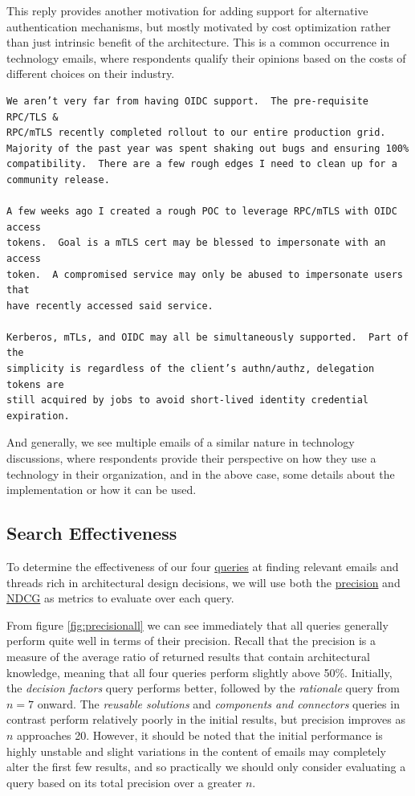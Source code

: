 \documentclass[a4paper, 12pt]{article}
\begin{document}
			This reply provides another motivation for adding support for alternative authentication mechanisms, but mostly motivated by cost optimization rather than just intrinsic benefit of the architecture. This is a common occurrence in technology emails, where respondents qualify their opinions based on the costs of different choices on their industry.
			
			\begin{verbatim}
We aren’t very far from having OIDC support.  The pre-requisite RPC/TLS &
RPC/mTLS recently completed rollout to our entire production grid.
Majority of the past year was spent shaking out bugs and ensuring 100%
compatibility.  There are a few rough edges I need to clean up for a
community release.

A few weeks ago I created a rough POC to leverage RPC/mTLS with OIDC access
tokens.  Goal is a mTLS cert may be blessed to impersonate with an access
token.  A compromised service may only be abused to impersonate users that
have recently accessed said service.

Kerberos, mTLs, and OIDC may all be simultaneously supported.  Part of the
simplicity is regardless of the client’s authn/authz, delegation tokens are
still acquired by jobs to avoid short-lived identity credential expiration.
			\end{verbatim}
			
			And generally, we see multiple emails of a similar nature in technology discussions, where respondents provide their perspective on how they use a technology in their organization, and in the above case, some details about the implementation or how it can be used.
	
	\subsection{Search Effectiveness}
		To determine the effectiveness of our four \hyperref[sec:queries]{queries} at finding relevant emails and threads rich in architectural design decisions, we will use both the \hyperref[eqn:precision]{precision} and \hyperref[eqn:ndcg]{NDCG} as metrics to evaluate over each query.
		
		From figure \ref{fig:precisionall} we can see immediately that all queries generally perform quite well in terms of their precision. Recall that the precision is a measure of the average ratio of returned results that contain architectural knowledge, meaning that all four queries perform slightly above 50\%. Initially, the \textit{decision factors} query performs better, followed by the \textit{rationale} query from $ n = 7 $ onward. The \textit{reusable solutions} and \textit{components and connectors} queries in contrast perform relatively poorly in the initial results, but precision improves as $ n $ approaches 20. However, it should be noted that the initial performance is highly unstable and slight variations in the content of emails may completely alter the first few results, and so practically we should only consider evaluating a query based on its total precision over a greater $ n $.
		
\end{document}
